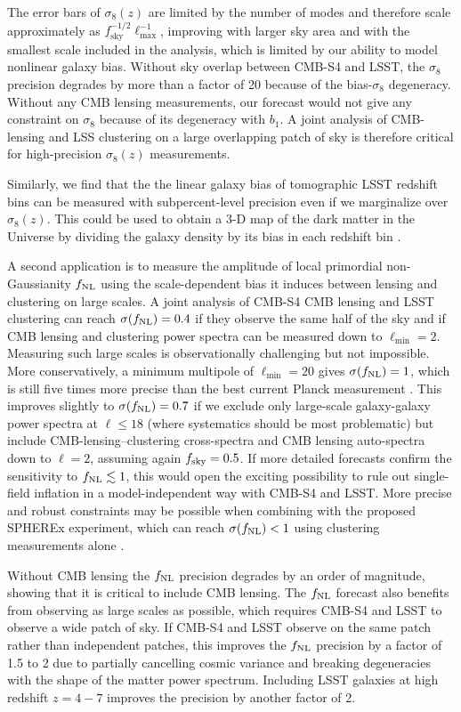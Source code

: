 \documentclass[prd,superscriptaddress,floatfix,notitlepage,nofootinbib,reprint]{revtex4-1} %
\begin{document}
The error bars of $\sigma_8(z)$ are limited by the number of modes and therefore scale approximately as $f_\mathrm{sky}^{-1/2}\ell_\mathrm{max}^{-1}$, improving with larger sky area and with the smallest scale included in the analysis, which is limited by our ability to model nonlinear galaxy bias.
Without sky overlap between CMB-S4 and LSST, the $\sigma_8$ precision degrades by more than a factor of 20 because of the bias-$\sigma_8$ degeneracy.
Without any CMB lensing measurements, our forecast would not give any constraint on $\sigma_8$ because of its degeneracy with $b_1$.
A joint analysis of CMB-lensing and LSS clustering on a large overlapping patch of sky is therefore critical for high-precision $\sigma_8(z)$ measurements.



Similarly, we find that the the linear galaxy bias of tomographic LSST redshift bins can be measured with subpercent-level precision even if we marginalize over $\sigma_8(z)$.
This could be used to obtain a 3-D map of the dark matter in the Universe by dividing the galaxy density by its bias in each redshift bin \cite{Pen0402008}.


A second application is to measure the amplitude of local primordial non-Gaussianity ${f_\mathrm{NL}}$ using the scale-dependent bias it induces between lensing and clustering on large scales.
A joint analysis of CMB-S4 CMB lensing and LSST clustering can reach $\sigma({f_\mathrm{NL}})=0.4$ if they observe the same half of the sky and if CMB lensing and clustering power spectra can be measured down to $\ell_\mathrm{min}=2$.
Measuring such large scales is observationally challenging but not impossible.
More conservatively, a minimum multipole of $\ell_\mathrm{min}=20$ gives $\sigma({f_\mathrm{NL}})=1$, which is still five times more precise than the best current Planck measurement \cite{Planck15fnl}.
This improves slightly to $\sigma({f_\mathrm{NL}})= 0.7$ if we exclude only large-scale galaxy-galaxy power spectra at $\ell\le 18$ (where systematics should be most problematic) but include CMB-lensing--clustering cross-spectra and CMB lensing auto-spectra down to $\ell=2$, assuming again ${f_\mathrm{sky}}=0.5$.
If more detailed forecasts confirm the sensitivity to ${f_\mathrm{NL}}\lesssim 1$, this would open the exciting possibility to rule out single-field inflation in a model-independent way with CMB-S4 and LSST.
More precise and robust constraints may be possible when combining with the proposed SPHEREx experiment, which can reach $\sigma({f_\mathrm{NL}})<1$ using clustering measurements alone \cite{Spherex1412}. 

Without CMB lensing the ${f_\mathrm{NL}}$ precision degrades by an order of magnitude, showing that it is critical to include CMB lensing.
The ${f_\mathrm{NL}}$ forecast also benefits from observing as large scales as possible, which requires CMB-S4 and LSST to observe a wide patch of sky. 
If CMB-S4 and LSST observe on the same patch rather than independent patches, this improves the ${f_\mathrm{NL}}$ precision by a factor of 1.5 to 2 due to partially cancelling cosmic variance and breaking degeneracies with the shape of the matter power spectrum.
Including LSST galaxies at high redshift $z=4-7$ improves the precision by another factor of 2.
\end{document}
